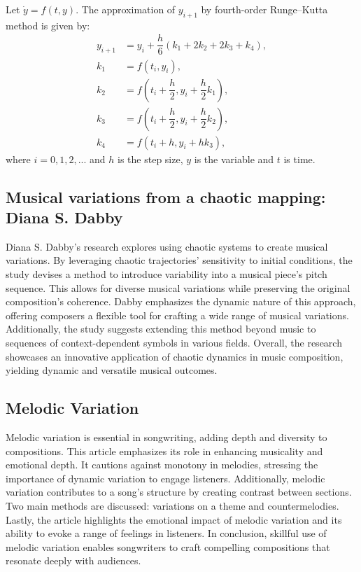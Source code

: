 \documentclass[11pt]{article}
\theoremstyle{definition}
\begin{document}
Let $\dot{y} = f(t,y)$. The approximation of $y_{i+1}$ by fourth-order Runge–Kutta method is given by:
\begin{align*}
y_{i+1} &= y_i + \dfrac{h}{6}(k_1 + 2k_2 + 2k_3 + k_4), \\
k_1 &= f(t_i, y_i), \\
k_2 &= f\left( t_i + \dfrac{h}{2}, y_i + \dfrac{h}{2}k_1 \right), \\
k_3 &= f\left( t_i + \dfrac{h}{2}, y_i + \dfrac{h}{2}k_2 \right), \\
k_4 &= f(t_i + h, y_i + hk_3),
\end{align*}
\label{fig:RK4}
where $i = 0,1,2,...$ and $h$ is the step size, $y$ is the variable and $t$ is time.

\subsection{Musical variations from a chaotic mapping: Diana S. Dabby}
Diana S. Dabby's research \cite{dabby_musical_1996} explores using chaotic systems to create musical variations. By leveraging chaotic trajectories' sensitivity to initial conditions, the study devises a method to introduce variability into a musical piece's pitch sequence. This allows for diverse musical variations while preserving the original composition's coherence. Dabby emphasizes the dynamic nature of this approach, offering composers a flexible tool for crafting a wide range of musical variations. Additionally, the study suggests extending this method beyond music to sequences of context-dependent symbols in various fields. Overall, the research showcases an innovative application of chaotic dynamics in music composition, yielding dynamic and versatile musical outcomes.

\subsection{Melodic Variation}
Melodic variation is essential in songwriting, adding depth and diversity to compositions. This article emphasizes its role in enhancing musicality and emotional depth. It cautions against monotony in melodies, stressing the importance of dynamic variation to engage listeners. Additionally, melodic variation contributes to a song's structure by creating contrast between sections. Two main methods are discussed: variations on a theme and countermelodies. Lastly, the article highlights the emotional impact of melodic variation and its ability to evoke a range of feelings in listeners. In conclusion, skillful use of melodic variation enables songwriters to craft compelling compositions that resonate deeply with audiences.
\end{document}
